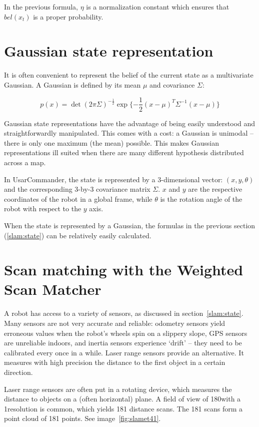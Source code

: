 In the previous formula, $\eta$ is a normalization constant which ensures that $bel(x_t)$ is a proper probability.

\section{Gaussian state representation}
It is often convenient to represent the belief of the current state as a multivariate Gaussian. A Gaussian is defined by its mean $\mu$ and covariance $\Sigma$:

\begin{equation}
p(x) = \det(2\pi\Sigma)^{-\frac{1}{2}}\exp{\{-\frac{1}{2}(x - \mu)^T\Sigma^{-1}(x - \mu)\}}
\end{equation}

Gaussian state representations have the advantage of being easily understood and straightforwardly manipulated. This comes with a cost: a Gaussian is unimodal -- there is only one maximum (the mean) possible. This makes Gaussian representations ill suited when there are many different hypothesis distributed across a map. 

In UsarCommander, the state is represented by a 3-dimensional vector: $(x, y, \theta)$ and the corresponding 3-by-3 covariance matrix $\Sigma$. $x$ and $y$ are the respective coordinates of the robot in a global frame, while $\theta$ is the rotation angle of the robot with respect to the $y$ axis.

When the state is represented by a Gaussian, the formulas in the previous section (\ref{slam:state}) can be relatively easily calculated.

\section{Scan matching with the Weighted Scan Matcher}
\label{scanmatching}
A robot has access to a variety of sensors, as discussed in section~\ref{slam:state}. Many sensors are not very accurate and reliable: odometry sensors yield erroneous values when the robot's wheels spin on a slippery slope, GPS sensors are unreliable indoors, and inertia sensors experience `drift' -- they need to be calibrated every once in a while. Laser range sensors provide an alternative. It measures with high precision the distance to the first object in a certain direction. 

Laser range sensors are often put in a rotating device, which measures the distance to objects on a (often horizontal) plane. A field of view of 180\degree with a 1\degree resolution is common, which yields 181 distance scans. The 181 scans form a point cloud of 181 points. See image~\ref{fig:slamet41}.

